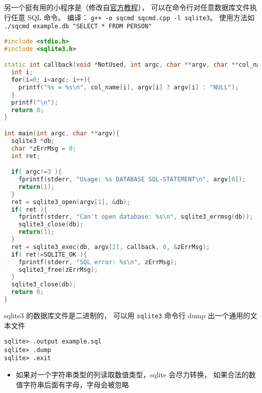 另一个挺有用的小程序是（修改自\href{https://www.sqlite.org/quickstart.html}{官方教程}）， 可以在命令行对任意数据库文件执行任意 SQL 命令。 编译： \verb|g++ -o sqcmd sqcmd.cpp -l sqlite3|。 使用方法如 \verb|./sqcmd example.db "SELECT * FROM PERSON"|
\begin{lstlisting}[language=cpp]
#include <stdio.h>
#include <sqlite3.h>

static int callback(void *NotUsed, int argc, char **argv, char **col_name){
  int i;
  for(i=0; i<argc; i++){
    printf("%s = %s\n", col_name[i], argv[i] ? argv[i] : "NULL");
  }
  printf("\n");
  return 0;
}

int main(int argc, char **argv){
  sqlite3 *db;
  char *zErrMsg = 0;
  int ret;

  if( argc!=3 ){
    fprintf(stderr, "Usage: %s DATABASE SQL-STATEMENT\n", argv[0]);
    return(1);
  }
  ret = sqlite3_open(argv[1], &db);
  if( ret ){
    fprintf(stderr, "Can't open database: %s\n", sqlite3_errmsg(db));
    sqlite3_close(db);
    return(1);
  }
  ret = sqlite3_exec(db, argv[2], callback, 0, &zErrMsg);
  if( ret!=SQLITE_OK ){
    fprintf(stderr, "SQL error: %s\n", zErrMsg);
    sqlite3_free(zErrMsg);
  }
  sqlite3_close(db);
  return 0;
}
\end{lstlisting}

sqlite3 的数据库文件是二进制的， 可以用 \verb|sqlite3| 命令行 dump 出一个通用的文本文件
\begin{lstlisting}[language=none]
sqlite> .output example.sql
sqlite> .dump
sqlite> .exit
\end{lstlisting}

\begin{itemize}
\item 如果对一个字符串类型的列读取数值类型，sqlite 会尽力转换， 如果合法的数值字符串后面有字母，字母会被忽略
\end{itemize}


